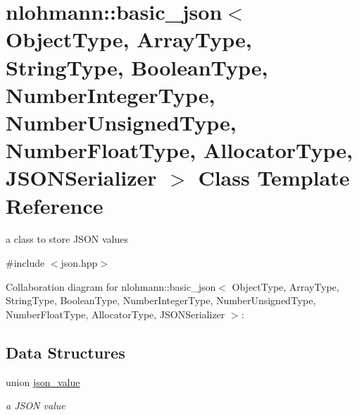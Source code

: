 \hypertarget{classnlohmann_1_1basic__json}{}\section{nlohmann\+:\+:basic\+\_\+json$<$ Object\+Type, Array\+Type, String\+Type, Boolean\+Type, Number\+Integer\+Type, Number\+Unsigned\+Type, Number\+Float\+Type, Allocator\+Type, J\+S\+O\+N\+Serializer $>$ Class Template Reference}
\label{classnlohmann_1_1basic__json}


a class to store J\+S\+ON values  




{\ttfamily \#include $<$json.\+hpp$>$}



Collaboration diagram for nlohmann\+:\+:basic\+\_\+json$<$ Object\+Type, Array\+Type, String\+Type, Boolean\+Type, Number\+Integer\+Type, Number\+Unsigned\+Type, Number\+Float\+Type, Allocator\+Type, J\+S\+O\+N\+Serializer $>$\+:
\subsection*{Data Structures}
\begin{DoxyCompactItemize}
\item 
union \hyperlink{unionnlohmann_1_1basic__json_1_1json__value}{json\+\_\+value}
\begin{DoxyCompactList}\small\item\em a J\+S\+ON value \end{DoxyCompactList}\end{DoxyCompactItemize}
